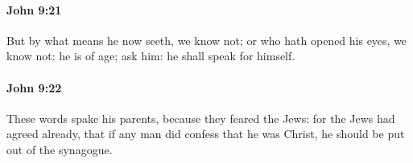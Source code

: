 		\paragraph{John 9:21} %
			\label{JOHN-9-21}

			But by what means he now seeth, we know not; or who hath opened his eyes, we know not: he is of age; ask him: he shall speak for himself.

			\begin{framed}
			\scriptsize
				\begin{compactdesc}
					\item[SBLG] 
				\end{compactdesc}
			\end{framed}

		\paragraph{John 9:22} %
			\label{JOHN-9-22}

			These words spake his parents, because they feared the Jews: for the Jews had agreed already, that if any man did confess that he was Christ, he should be put out of the synagogue.

